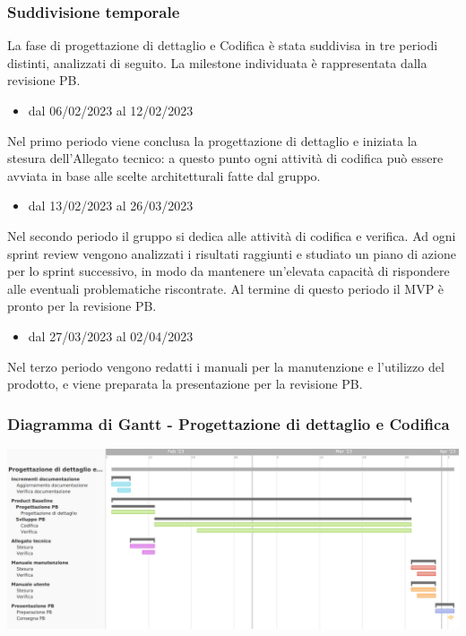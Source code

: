 \subsubsection{Suddivisione temporale}
La fase di progettazione di dettaglio e Codifica è stata suddivisa in tre periodi distinti, analizzati di seguito. La milestone individuata è rappresentata dalla revisione PB.

\begin{itemize}
    \item dal 06/02/2023 al 12/02/2023
\end{itemize}
Nel primo periodo viene conclusa la progettazione di dettaglio e iniziata la stesura dell’Allegato tecnico: a questo punto ogni attività di codifica può essere avviata in base alle scelte architetturali fatte dal gruppo.

\begin{itemize}
    \item dal 13/02/2023 al 26/03/2023
\end{itemize}
Nel secondo periodo il gruppo si dedica alle attività di codifica e verifica. Ad ogni sprint review vengono analizzati i risultati raggiunti e studiato un piano di azione per lo sprint successivo, in modo da mantenere un’elevata capacità di rispondere alle eventuali problematiche riscontrate. Al termine di questo periodo il MVP è pronto per la revisione PB.

\begin{itemize}
    \item dal 27/03/2023 al 02/04/2023
\end{itemize}
Nel terzo periodo vengono redatti i manuali per la manutenzione e l’utilizzo del prodotto, e viene preparata la presentazione per la revisione PB.

\subsubsection{Diagramma di Gantt - Progettazione di dettaglio e Codifica}
\includegraphics[width=\textwidth]{src/img/4_codifica.png}\\

